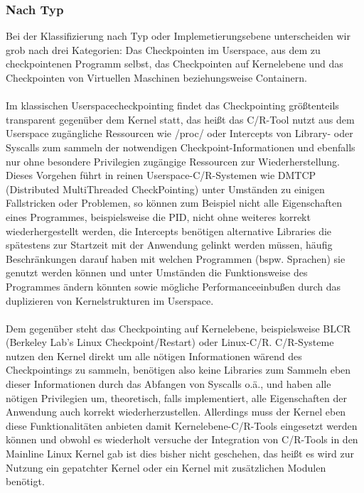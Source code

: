 \documentclass[12pt]{scrartcl}
\begin{document}
\subsubsection{Nach Typ}
Bei der Klassifizierung nach Typ oder Implemetierungsebene unterscheiden wir grob nach drei Kategorien: Das Checkpointen im Userspace, aus dem zu checkpointenen Programm selbst, das Checkpointen auf Kernelebene und das Checkpointen von Virtuellen Maschinen beziehungsweise Containern.\\ \\
Im klassischen Userspacecheckpointing findet das Checkpointing größtenteils transparent gegenüber dem Kernel statt, das heißt das C/R-Tool nutzt aus dem Userspace zugängliche Ressourcen wie /proc/ oder Intercepts von Library- oder Syscalls zum sammeln der notwendigen Checkpoint-Informationen und ebenfalls nur ohne besondere Privilegien zugängige Ressourcen zur Wiederherstellung. 
Dieses Vorgehen führt in reinen Userspace-C/R-Systemen wie DMTCP (Distributed MultiThreaded CheckPointing) unter Umständen zu einigen Fallstricken oder Problemen, so können zum Beispiel nicht alle Eigenschaften eines Programmes, beispielsweise die PID, nicht ohne weiteres korrekt wiederhergestellt werden, die Intercepts benötigen alternative Libraries die spätestens zur Startzeit mit der Anwendung gelinkt werden müssen, häufig Beschränkungen darauf haben mit welchen Programmen (bspw. Sprachen) sie genutzt werden können und unter Umständen die Funktionsweise des Programmes ändern könnten sowie mögliche Performanceeinbußen durch das duplizieren von Kernelstrukturen im Userspace.\\ \\
Dem gegenüber steht das Checkpointing auf Kernelebene, beispielsweise BLCR (Berkeley Lab's Linux Checkpoint/Restart) oder Linux-C/R.
C/R-Systeme nutzen den Kernel direkt um alle nötigen Informationen wärend des Checkpointings zu sammeln, benötigen also keine Libraries zum Sammeln eben dieser Informationen durch das Abfangen von Syscalls o.ä., und haben alle nötigen Privilegien um, theoretisch, falls implementiert, alle Eigenschaften der Anwendung auch korrekt wiederherzustellen. Allerdings muss der Kernel eben diese Funktionalitäten anbieten damit Kernelebene-C/R-Tools eingesetzt werden können und obwohl es wiederholt versuche der Integration von C/R-Tools in den Mainline Linux Kernel gab ist dies bisher nicht geschehen, das heißt es wird zur Nutzung ein gepatchter Kernel oder ein Kernel mit zusätzlichen Modulen benötigt.\\
\end{document}
